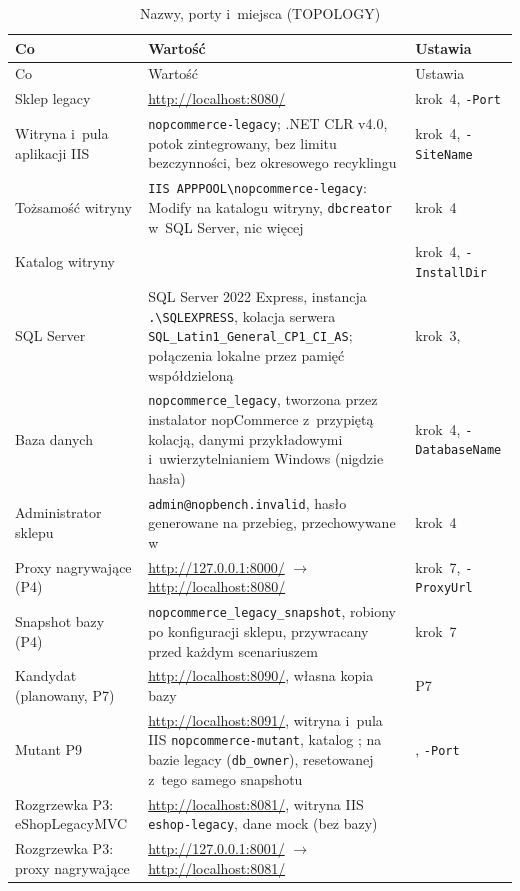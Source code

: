{\footnotesize
\begin{xltabular}{\linewidth}{@{}>{\raggedright\arraybackslash}p{3.3cm} >{\raggedright\arraybackslash}X >{\raggedright\arraybackslash}p{3.6cm}@{}}
\caption{Nazwy, porty i~miejsca (TOPOLOGY)}\label{tab:bench-porty}\\
\toprule
Co & Wartość & Ustawia \\
\midrule
\endfirsthead
\toprule
Co & Wartość & Ustawia \\
\midrule
\endhead
\bottomrule
\endlastfoot
Sklep legacy & \url{http://localhost:8080/} & krok~4, \texttt{-Port} \\
Witryna i~pula aplikacji IIS & \texttt{nopcommerce-legacy}; .NET CLR v4.0, potok
  zintegrowany, bez limitu bezczynności, bez okresowego recyklingu & krok~4,
  \texttt{-SiteName} \\
Tożsamość witryny & \texttt{IIS APPPOOL\textbackslash{}nopcommerce-legacy}: Modify na
  katalogu witryny, \texttt{dbcreator} w~SQL Server, nic więcej & krok~4 \\
Katalog witryny &  & krok~4, \texttt{-InstallDir} \\
SQL Server & SQL Server 2022 Express, instancja \texttt{.\textbackslash{}SQLEXPRESS},
  kolacja serwera \texttt{SQL\_Latin1\_General\_CP1\_CI\_AS}; połączenia lokalne przez
  pamięć współdzieloną & krok~3,  \\
Baza danych & \texttt{nopcommerce\_legacy}, tworzona przez instalator nopCommerce
  z~przypiętą kolacją, danymi przykładowymi i~uwierzytelnianiem Windows (nigdzie hasła) &
  krok~4, \texttt{-DatabaseName} \\
Administrator sklepu & \texttt{admin@nopbench.invalid}, hasło generowane na przebieg,
  przechowywane w~ & krok~4 \\
Proxy nagrywające (P4) & \url{http://127.0.0.1:8000/} $\rightarrow$
  \url{http://localhost:8080/} & krok~7, \texttt{-ProxyUrl} \\
Snapshot bazy (P4) & \texttt{nopcommerce\_legacy\_snapshot}, robiony po konfiguracji
  sklepu, przywracany przed każdym scenariuszem & krok~7 \\
Kandydat (planowany, P7) & \url{http://localhost:8090/}, własna kopia bazy & P7 \\
Mutant P9 & \url{http://localhost:8091/}, witryna i~pula IIS \texttt{nopcommerce-mutant},
  katalog ; na bazie legacy (\texttt{db\_owner}),
  resetowanej z~tego samego snapshotu & ,
  \texttt{-Port} \\
Rozgrzewka P3: eShopLegacyMVC & \url{http://localhost:8081/}, witryna IIS
  \texttt{eshop-legacy}, dane mock (bez bazy) &  \\
Rozgrzewka P3: proxy nagrywające & \url{http://127.0.0.1:8001/} $\rightarrow$
  \url{http://localhost:8081/} &  \\
\end{xltabular}
}

